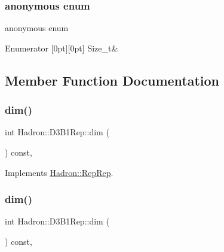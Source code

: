 \subsubsection{\texorpdfstring{anonymous enum}{anonymous enum}}
{\footnotesize\ttfamily anonymous enum}

\begin{DoxyEnumFields}{Enumerator}
[0pt][0pt]{}\mbox{\label{structHadron_1_1D3B1Rep_a2a7255db4f42a77aa8f4ef71c86f12b2a51cdab27d251fa31de869f956c070090}} 
Size\+\_\+t&\\
\hline

\end{DoxyEnumFields}


\subsection{Member Function Documentation}
\mbox{\label{structHadron_1_1D3B1Rep_ae0ea1d6f2720000159957d1303038399}} 
\subsubsection{\texorpdfstring{dim()}{dim()}\hspace{0.1cm}{\footnotesize\ttfamily [1/5]}}
{\footnotesize\ttfamily int Hadron\+::\+D3\+B1\+Rep\+::dim (\begin{DoxyParamCaption}{ }\end{DoxyParamCaption}) const\hspace{0.3cm}{\ttfamily [inline]}, {\ttfamily [virtual]}}



Implements \mbox{\hyperlink{structHadron_1_1RepRep_a92c8802e5ed7afd7da43ccfd5b7cd92b}{Hadron\+::\+Rep\+Rep}}.

\mbox{\label{structHadron_1_1D3B1Rep_ae0ea1d6f2720000159957d1303038399}} 
\subsubsection{\texorpdfstring{dim()}{dim()}\hspace{0.1cm}{\footnotesize\ttfamily [2/5]}}
{\footnotesize\ttfamily int Hadron\+::\+D3\+B1\+Rep\+::dim (\begin{DoxyParamCaption}{ }\end{DoxyParamCaption}) const\hspace{0.3cm}{\ttfamily [inline]}, {\ttfamily [virtual]}}



